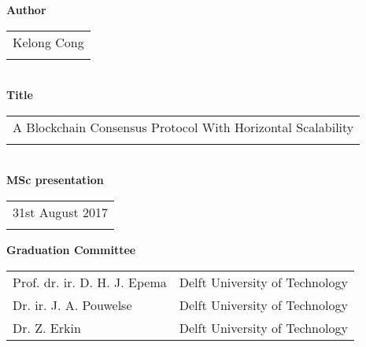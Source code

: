 \thispagestyle{empty}

\noindent \textbf{Author}\\
\begin{tabular}{l}
Kelong Cong\\
\\
\end{tabular}\\
\noindent \textbf{Title}\\
\begin{tabular}{l}
A Blockchain Consensus Protocol With Horizontal Scalability\\
\\
\end{tabular}\\
\noindent \textbf{MSc presentation}\\
\begin{tabular}{l}
31st August 2017\\
\\
\end{tabular}

\vspace{1.1cm}

\noindent \textbf{Graduation Committee}\\
\begin{tabular}{ll}
Prof. dr. ir. D. H. J. Epema            & Delft University of Technology \\
Dr. ir. J. A. Pouwelse                  & Delft University of Technology \\
Dr. Z. Erkin                            & Delft University of Technology \\
\end{tabular}

